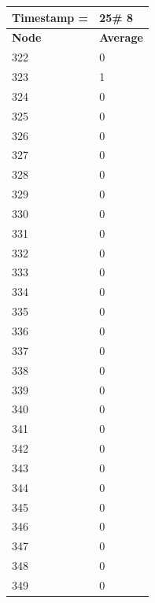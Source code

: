 \begin{tabular}{|l||l|}
\hline
\textbf{Timestamp =} & \textbf{25}\# 8\\\hline
	\textbf{Node} & \textbf{Average} \\ \hline
\hline
	322 & 0 \\ \hline
	323 & 1 \\ \hline
	324 & 0 \\ \hline
	325 & 0 \\ \hline
	326 & 0 \\ \hline
	327 & 0 \\ \hline
	328 & 0 \\ \hline
	329 & 0 \\ \hline
	330 & 0 \\ \hline
	331 & 0 \\ \hline
	332 & 0 \\ \hline
	333 & 0 \\ \hline
	334 & 0 \\ \hline
	335 & 0 \\ \hline
	336 & 0 \\ \hline
	337 & 0 \\ \hline
	338 & 0 \\ \hline
	339 & 0 \\ \hline
	340 & 0 \\ \hline
	341 & 0 \\ \hline
	342 & 0 \\ \hline
	343 & 0 \\ \hline
	344 & 0 \\ \hline
	345 & 0 \\ \hline
	346 & 0 \\ \hline
	347 & 0 \\ \hline
	348 & 0 \\ \hline
	349 & 0 \\ \hline
\end{tabular}

